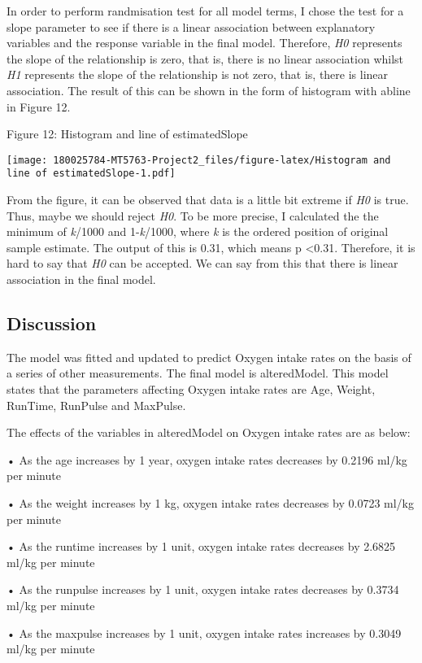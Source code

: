 \documentclass[]{article}
\begin{document}
In order to perform randmisation test for all model terms, I chose the
test for a slope parameter to see if there is a linear association
between explanatory variables and the response variable in the final
model. Therefore, \emph{H0} represents the slope of the relationship is
zero, that is, there is no linear association whilst \emph{H1}
represents the slope of the relationship is not zero, that is, there is
linear association. The result of this can be shown in the form of
histogram with abline in Figure 12.

Figure 12: Histogram and line of estimatedSlope

\texttt{[image: 180025784-MT5763-Project2\_files/figure-latex/Histogram and line of estimatedSlope-1.pdf]}

From the figure, it can be observed that data is a little bit extreme if
\emph{H0} is true. Thus, maybe we should reject \emph{H0}. To be more
precise, I calculated the the minimum of \emph{k}/1000 and
1-\emph{k}/1000, where \emph{k} is the ordered position of original
sample estimate. The output of this is 0.31, which means p
\textless{}0.31. Therefore, it is hard to say that \emph{H0} can be
accepted. We can say from this that there is linear association in the
final model.

\pagebreak

\subsection{Discussion}\label{discussion}

The model was fitted and updated to predict Oxygen intake rates on the
basis of a series of other measurements. The final model is
alteredModel. This model states that the parameters affecting Oxygen
intake rates are Age, Weight, RunTime, RunPulse and MaxPulse.

The effects of the variables in alteredModel on Oxygen intake rates are
as below:

• As the age increases by 1 year, oxygen intake rates decreases by
0.2196 ml/kg per minute

• As the weight increases by 1 kg, oxygen intake rates decreases by
0.0723 ml/kg per minute

• As the runtime increases by 1 unit, oxygen intake rates decreases by
2.6825 ml/kg per minute

• As the runpulse increases by 1 unit, oxygen intake rates decreases by
0.3734 ml/kg per minute

• As the maxpulse increases by 1 unit, oxygen intake rates increases by
0.3049 ml/kg per minute
\end{document}

